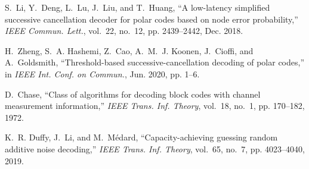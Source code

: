 \documentclass[conference]{IEEEtran}
\begin{document}
\begin{thebibliography}{10}
S.~Li, Y.~Deng, L.~Lu, J.~Liu, and T.~Huang, ``A low-latency simplified
  successive cancellation decoder for polar codes based on node error
  probability,'' \emph{IEEE Commun. Lett.}, vol.~22, no.~12, pp. 2439--2442,
  Dec. 2018.

H.~{Zheng}, S.~A. {Hashemi}, Z.~{Cao}, A.~M.~J. {Koonen}, J.~{Cioffi}, and
  A.~{Goldsmith}, ``Threshold-based successive-cancellation decoding of polar
  codes,'' in \emph{IEEE Int. Conf. on Commun.}, Jun. 2020, pp. 1--6.

D.~Chase, ``Class of algorithms for decoding block codes with channel
  measurement information,'' \emph{IEEE Trans. Inf. Theory}, vol.~18, no.~1,
  pp. 170--182, 1972.

K.~R. Duffy, J.~Li, and M.~Médard, ``Capacity-achieving guessing random
  additive noise decoding,'' \emph{IEEE Trans. Inf. Theory}, vol.~65, no.~7,
  pp. 4023--4040, 2019.

\end{thebibliography}
\end{document}
